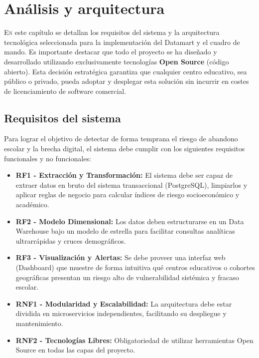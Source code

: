 \chapter{Análisis y arquitectura}
\label{chap:analisis_arquitectura}

\lettrine{E}{n} este capítulo se detallan los requisitos del sistema y la arquitectura tecnológica seleccionada para la implementación del Datamart y el cuadro de mando. Es importante destacar que todo el proyecto se ha diseñado y desarrollado utilizando exclusivamente tecnologías \textbf{Open Source} (código abierto). Esta decisión estratégica garantiza que cualquier centro educativo, sea público o privado, pueda adoptar y desplegar esta solución sin incurrir en costes de licenciamiento de software comercial.

\section{Requisitos del sistema}

Para lograr el objetivo de detectar de forma temprana el riesgo de abandono escolar y la brecha digital, el sistema debe cumplir con los siguientes requisitos funcionales y no funcionales:

\begin{itemize}
    \item \textbf{RF1 - Extracción y Transformación:} El sistema debe ser capaz de extraer datos en bruto del sistema transaccional (PostgreSQL), limpiarlos y aplicar reglas de negocio para calcular índices de riesgo socioeconómico y académico.
    \item \textbf{RF2 - Modelo Dimensional:} Los datos deben estructurarse en un Data Warehouse bajo un modelo de estrella para facilitar consultas analíticas ultrarrápidas y cruces demográficos.
    \item \textbf{RF3 - Visualización y Alertas:} Se debe proveer una interfaz web (Dashboard) que muestre de forma intuitiva qué centros educativos o cohortes geográficas presentan un riesgo alto de vulnerabilidad sistémica y fracaso escolar.
    \item \textbf{RNF1 - Modularidad y Escalabilidad:} La arquitectura debe estar dividida en microservicios independientes, facilitando su despliegue y mantenimiento.
    \item \textbf{RNF2 - Tecnologías Libres:} Obligatoriedad de utilizar herramientas Open Source en todas las capas del proyecto.
\end{itemize}

